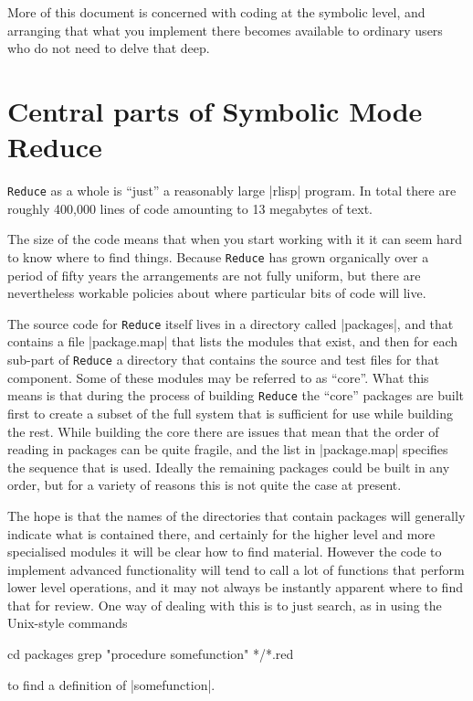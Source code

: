 \documentclass[12pt,twoside,openright]{memoir}
\newcommand{\reduce}{\texttt{Reduce}\xspace}
\begin{document}
More of this document is concerned with coding at the symbolic level, and
arranging that what you implement there becomes available to ordinary users
who do not need to delve that deep.

\section{Central parts of Symbolic Mode Reduce}

\reduce as a whole is ``just'' a reasonably large |rlisp| program. In total
there are roughly 400,000 lines of code amounting to 13 megabytes of text.

The size of the code means that when you start working with it it can seem
hard to know where to find things. Because \reduce has grown organically
over a period of fifty years the arrangements are not fully uniform, but
there are nevertheless workable policies about where particular bits of code
will live.

\label{p:centralparts}
The source code for \reduce itself lives in a directory called |packages|,
and that contains a file |package.map| that lists the modules that exist,
and then for each sub-part of \reduce a directory that contains the
source and test files for that component. Some of these modules may be
referred to as ``core''. What this means is that during the process of building
\reduce the ``core'' packages are built first  to create a subset of the
full system that is sufficient for use while building the rest. While building
the core there are issues that mean that the order of reading in packages
can be quite fragile, and the list in |package.map| specifies the sequence
that is used. Ideally the remaining packages could be built in any order, but
for a variety of reasons this is not quite the case at present.

The hope is that the names of the directories that contain packages will
generally indicate what is contained there, and certainly for the higher
level and more specialised modules it will be clear how to find material.
However the code to implement advanced functionality will tend to call
a lot of functions that perform lower level operations, and it may not
always be instantly apparent where to find that for review. One way of
dealing with this is to just search, as in using the Unix-style commands
\begin{rlispverb}
   cd packages
   grep "procedure somefunction" */*.red
\end{rlispverb}
\noindent to find a definition of |somefunction|.
\end{document}
